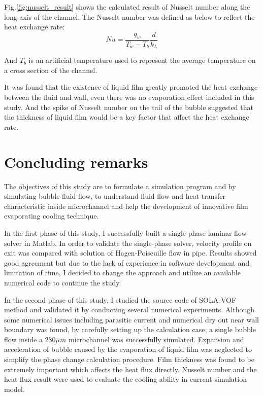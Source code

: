\documentclass[a4,14pt]{extarticle}
\begin{document}
Fig.\ref{fig:nusselt_result} shows the calculated result of Nusselt number along the
long-axis of the channel. The Nusselt number was defined as below to reflect the
heat exchange rate:
\begin{equation}
Nu = \frac{q_w}{T_w-T_b} \frac{d}{k_L}
\end{equation}


And $T_b$ is an artificial temperature used to represent the average temperature on
a cross section of the channel.

It was found that the existence of liquid film greatly promoted the heat exchange
between the fluid and wall, even there was no evaporation effect included in this
study. And the spike of Nusselt number on the tail of the bubble suggested that the
thickness of liquid film would be a key factor that affect the heat exchange rate.

\section{Concluding remarks}

The objectives of this study are to formulate a simulation program and by simulating
bubble fluid flow, to understand fluid flow and heat transfer characteristic inside
microchannel and help the development of innovative film evaporating cooling technique.

In the first phase of this study, I successfully built a single phase laminar flow
solver in Matlab. In order to validate the single-phase solver, velocity profile on exit was
compared with solution of Hagen-Poiseuille flow in pipe. Results showed good agreement
but due to the lack of experience in software development and limitation of time, I decided
to change the approach and utilize an available numerical code to continue the study.

In the second phase of this study, I studied the source code of SOLA-VOF method and validated
it by conducting several numerical experiments. Although some numerical issues including parasitic current
and numerical dry out near wall boundary was found, by carefully setting up the calculation
case, a single bubble flow inside a $280\mu m$ microchannel was successfully simulated.
Expansion and acceleration of bubble caused by the evaporation of liquid film was neglected
to simplify the phase change calculation procedure. Film thickness was found to be extremely
important which affects the heat flux directly. Nusselt number and the heat flux
result were used to evaluate the cooling ability in current simulation model.
\end{document}
